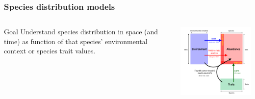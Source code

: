 \documentclass{beamer}
\begin{document}
\begin{frame}
  \frametitle{Species distribution models}

  \begin{columns}
    \begin{column}{0.5\textwidth}
      \begin{block}{Goal}
        Understand species distribution in space (and time) as function of that species' environmental context or species trait values.
      \end{block}
    \end{column}
    \begin{column}{0.5\textwidth}
      \begin{center}
        \includegraphics[width = \textwidth,height = 0.5\textheight,keepaspectratio = true]{figure/warton_corner_models}
      \end{center}
    \end{column}
  \end{columns}


  \footnotesize{}
\end{frame}
\end{document}
